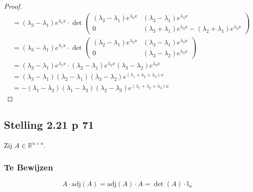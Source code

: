 \documentclass[lineaire_algebra_oplossingen.tex]{subfiles}
\begin{document}
\begin{proof}
\begin{align*}
&= (\lambda_3-\lambda_1) e^{\lambda_1x} \cdot \det
\begin{pmatrix}
(\lambda_2-\lambda_1) e^{\lambda_2x} & (\lambda_3-\lambda_1) e^{\lambda_3x} \\
0                                    & (\lambda_3+\lambda_1) e^{\lambda_3x} - (\lambda_2+\lambda_1) e^{\lambda_3x}
\end{pmatrix} \\
&= (\lambda_3-\lambda_1) e^{\lambda_1x} \cdot \det
\begin{pmatrix}
(\lambda_2-\lambda_1) e^{\lambda_2x} & (\lambda_3-\lambda_1) e^{\lambda_3x} \\
0                                    & (\lambda_3-\lambda_2) e^{\lambda_3x}
\end{pmatrix} \\
&= (\lambda_3-\lambda_1) e^{\lambda_1x} \cdot
(\lambda_2-\lambda_1) e^{\lambda_2x} (\lambda_3-\lambda_2) e^{\lambda_3x} \\
&= (\lambda_3-\lambda_1) (\lambda_2-\lambda_1) (\lambda_3-\lambda_2)
e^{(\lambda_1 + \lambda_2 + \lambda_3)x} \\
&= -(\lambda_1-\lambda_2) (\lambda_1-\lambda_3) (\lambda_2-\lambda_3)
e^{(\lambda_1 + \lambda_2 + \lambda_3)x}
\end{align*}
\end{proof}
\subsection{Stelling 2.21 p 71}
\label{2.21}
Zij $A \in \mathbb{R}^{n\times n}$.

\subsubsection*{Te Bewijzen}
\[
A\cdot \text{adj}(A) = \text{adj}(A) \cdot A = \det(A)\cdot\mathbb{I}_n
\]
\end{document}
